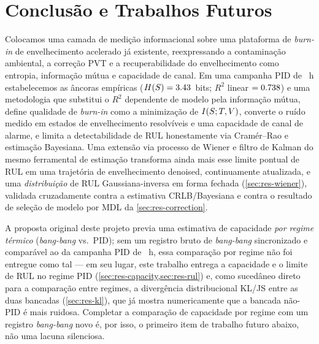 \section{Conclusão e Trabalhos Futuros}
\label{sec:conclusion}

Colocamos uma camada de medição informacional sobre uma plataforma de
\emph{burn-in} de envelhecimento acelerado já existente, reexpressando a
contaminação ambiental, a correção PVT e a recuperabilidade do
envelhecimento como entropia, informação mútua e capacidade de canal. Em
uma campanha PID de \valDurationHours~h estabelecemos as âncoras empíricas
($H\!\left(S\right)=3.43$~bits; $R^2$ linear $=0.738$) e uma metodologia
que substitui o $R^2$ dependente de modelo pela informação mútua, define
qualidade de \emph{burn-in} como a minimização de
$I\!\left(S ; T,V\right)$, converte o ruído medido em estados de
envelhecimento resolvíveis e uma capacidade de canal de alarme, e limita a
detectabilidade de RUL honestamente via Cram\'er--Rao e estimação
Bayesiana. Uma extensão via processo de Wiener e filtro de Kalman do mesmo
ferramental de estimação transforma ainda mais esse limite pontual de RUL
em uma trajetória de envelhecimento denoised, continuamente atualizada, e
uma \emph{distribuição} de RUL Gaussiana-inversa em forma fechada
(\cref{sec:res-wiener}), validada cruzadamente contra a estimativa
CRLB/Bayesiana e contra o resultado de seleção de modelo por MDL da
\cref{sec:res-correction}.

A proposta original deste projeto previa uma estimativa de capacidade
\emph{por regime térmico} (\emph{bang-bang} vs.\ PID); sem um registro bruto
de \emph{bang-bang} sincronizado e comparável ao da campanha PID de
\valDurationHours~h, essa comparação por regime não foi entregue como tal
--- em seu lugar, este trabalho entrega a capacidade e o limite de RUL no
regime PID (\cref{sec:res-capacity,sec:res-rul}) e, como sucedâneo direto
para a comparação entre regimes, a divergência distribucional KL/JS entre
as duas bancadas (\cref{sec:res-kl}), que já mostra numericamente que a
bancada não-PID é mais ruidosa. Completar a comparação de capacidade por
regime com um registro \emph{bang-bang} novo é, por isso, o primeiro item
de trabalho futuro abaixo, não uma lacuna silenciosa.

